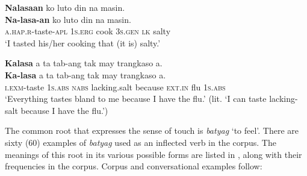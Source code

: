 \ea
\textbf{Nalasaan}  ko  luto  din  na  masin. \\\smallskip
\gll \textbf{Na-lasa-an}  ko  luto  din  na  masin. \\
\textsc{a.hap.r}-taste-\textsc{apl}  1\textsc{s.erg}  cook  3\textsc{s.gen}  \textsc{lk}  salty \\
\glt ‘I tasted his/her cooking that (it is) salty.’
\z

\ea
\textbf{Kalasa}  a  ta  tab-ang  tak  may  trangkaso  a. \\\smallskip
\gll \textbf{Ka-lasa}  a  ta  tab-ang  tak  may  trangkaso  a. \\
\textsc{i.exm}-taste  1\textsc{s.abs}  \textsc{nabs}  lacking.salt  because  \textsc{ext.in}  flu  1\textsc{s.abs} \\
\glt ‘Everything tastes bland to me because I have the flu.’ (lit. ‘I can taste lacking-salt because I have the flu.’)
\z

The common root that expresses the sense of touch is \textit{batyag} ‘to feel’. There are sixty (60) examples of \textit{batyag} used as an inflected verb in the corpus. The meanings of this root in its various possible forms are listed in , along with their frequencies in the corpus. Corpus and conversational examples follow:

